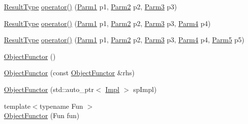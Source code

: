 \begin{DoxyCompactItemize}
\item 
\mbox{\hyperlink{classUtil_1_1ObjectFunctor_a77f816e98108848347d0dfc085090a1c}{Result\+Type}} \mbox{\hyperlink{classUtil_1_1ObjectFunctor_a6dea319b30584bd1bb9f6bf4b8d36e11}{operator()}} (\mbox{\hyperlink{classUtil_1_1ObjectFunctor_a199715d28029627c2ae7219c13b04d26}{Parm1}} p1, \mbox{\hyperlink{classUtil_1_1ObjectFunctor_a6809cf65883dc7575e01d9b9849649cf}{Parm2}} p2, \mbox{\hyperlink{classUtil_1_1ObjectFunctor_a6becd26610c6091b9ba93cd96f3def66}{Parm3}} p3)
\item 
\mbox{\hyperlink{classUtil_1_1ObjectFunctor_a77f816e98108848347d0dfc085090a1c}{Result\+Type}} \mbox{\hyperlink{classUtil_1_1ObjectFunctor_a87c6264782e6c535c3a66f385d922f12}{operator()}} (\mbox{\hyperlink{classUtil_1_1ObjectFunctor_a199715d28029627c2ae7219c13b04d26}{Parm1}} p1, \mbox{\hyperlink{classUtil_1_1ObjectFunctor_a6809cf65883dc7575e01d9b9849649cf}{Parm2}} p2, \mbox{\hyperlink{classUtil_1_1ObjectFunctor_a6becd26610c6091b9ba93cd96f3def66}{Parm3}} p3, \mbox{\hyperlink{classUtil_1_1ObjectFunctor_a54ce0b64981cd7f558ce8eea7df3f1b2}{Parm4}} p4)
\item 
\mbox{\hyperlink{classUtil_1_1ObjectFunctor_a77f816e98108848347d0dfc085090a1c}{Result\+Type}} \mbox{\hyperlink{classUtil_1_1ObjectFunctor_a95b7e08a92f54e2ce8a90153c1414abd}{operator()}} (\mbox{\hyperlink{classUtil_1_1ObjectFunctor_a199715d28029627c2ae7219c13b04d26}{Parm1}} p1, \mbox{\hyperlink{classUtil_1_1ObjectFunctor_a6809cf65883dc7575e01d9b9849649cf}{Parm2}} p2, \mbox{\hyperlink{classUtil_1_1ObjectFunctor_a6becd26610c6091b9ba93cd96f3def66}{Parm3}} p3, \mbox{\hyperlink{classUtil_1_1ObjectFunctor_a54ce0b64981cd7f558ce8eea7df3f1b2}{Parm4}} p4, \mbox{\hyperlink{classUtil_1_1ObjectFunctor_a8428e04dd3fb91bc7f7c518a1771eecb}{Parm5}} p5)
\item 
\mbox{\hyperlink{classUtil_1_1ObjectFunctor_ac08a0820c0cf21a61abb6da3ede541d4}{Object\+Functor}} ()
\item 
\mbox{\hyperlink{classUtil_1_1ObjectFunctor_a2d42842ec3d69b317aaaafd65cd9e2fd}{Object\+Functor}} (const \mbox{\hyperlink{classUtil_1_1ObjectFunctor}{Object\+Functor}} \&rhs)
\item 
\mbox{\hyperlink{classUtil_1_1ObjectFunctor_a60702c933bbfec0d0a0e4459debe21b7}{Object\+Functor}} (std\+::auto\+\_\+ptr$<$ \mbox{\hyperlink{classUtil_1_1ObjectFunctor_a93fc635194d1d2768e73ba87d03abd8d}{Impl}} $>$ sp\+Impl)
\item 
{\footnotesize template$<$typename Fun $>$ }\\\mbox{\hyperlink{classUtil_1_1ObjectFunctor_a8a0c7fe30526a774ce94c7a24af4108d}{Object\+Functor}} (Fun fun)

\end{DoxyCompactItemize}
